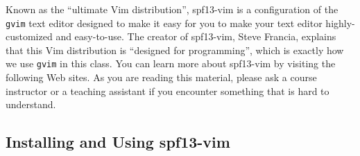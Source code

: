 Known as the ``ultimate Vim distribution'', spf13-vim is a configuration of the {\tt gvim} text editor designed to make it
easy for you to make your text editor highly-customized and easy-to-use.  The creator of spf13-vim, Steve Francia,
explains that this Vim distribution is ``designed for programming'', which is exactly how we use {\tt gvim} in this class. You
can learn more about spf13-vim by visiting the following Web sites.  As you are reading this material, please ask a
course instructor or a teaching assistant if you encounter something that is hard to understand.

\vspace*{-.15in}
\subsection*{Installing and Using spf13-vim} 
\vspace*{-.05in}







\vspace*{-.15in}
